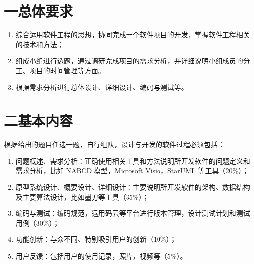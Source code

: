 
\section*{一\quad 总体要求}
\begin{enumerate}
  \item 综合运用软件工程的思想，协同完成一个软件项目的开发，掌握软件工程相关的技术和方法；
  \item 组成小组进行选题，通过调研完成项目的需求分析，并详细说明小组成员的分工、项目的时间管理等方面。
  \item 根据需求分析进行总体设计、详细设计、编码与测试等。
\end{enumerate}

\section*{二\quad 基本内容}
根据给出的题目任选一题，自行组队，设计与开发的软件过程必须包括：
\begin{enumerate}
  \item 问题概述、需求分析：正确使用相关工具和方法说明所开发软件的问题定义和需求分析，比如 NABCD 模型，Microsoft Visio，StarUML 等工具（20\%）；
  \item 原型系统设计、概要设计、详细设计：主要说明所开发软件的架构、数据结构及主要算法设计，比如墨刀等工具（35\%）；
  \item 编码与测试：编码规范，运用码云等平台进行版本管理，设计测试计划和测试用例（30\%）；
  \item 功能创新：与众不同、特别吸引用户的创新（10\%）；
  \item 用户反馈：包括用户的使用记录，照片，视频等（5\%）。
\end{enumerate}
